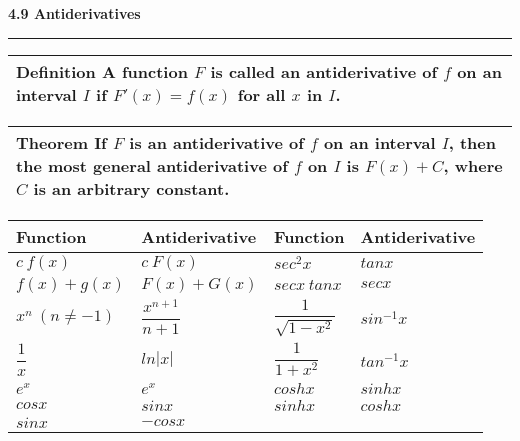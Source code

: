 \documentclass{article}
\begin{document}
\begin{center}
\Large\textbf{4.9 Antiderivatives}

\noindent\hfill\rule{0.3\textwidth}{.4pt}\hfill
\vspace{24pt}

\large
\def\arraystretch{1.3}
{\setlength{\tabcolsep}{16pt}
\begin{tabularx}{.9\textwidth}{|X|}
\hline
	\vspace{1pt}
	\textbf{Definition} \: A function $F$ is called an \textbf{antiderivative} of $f$ on an interval $I$ if $F'(x) = f(x)$ for all $x$ in $I$. \\[12pt]
\hline
\end{tabularx}}
\vspace{12pt}

\large
\def\arraystretch{1.3}
{\setlength{\tabcolsep}{16pt}
\begin{tabularx}{.9\textwidth}{|X|}
\hline
	\vspace{1pt}
	\textbf{Theorem} \: If $F$ is an antiderivative of $f$ on an interval $I$, then the most general antiderivative of $f$ on $I$ is $F(x) + C$, where $C$ is an arbitrary constant. \\[12pt]
\hline
\end{tabularx}}
\vspace{24pt}

\large
\def\arraystretch{2}
{\setlength{\tabcolsep}{16pt}
\begin{tabularx}{.9\textwidth}{| X | l || X | l |}
\hline
	
	\textbf{Function} & \textbf{Antiderivative} & \textbf{Function} & \textbf{Antiderivative}  \\
	\hline
	$c \: f(x)$ & $c \: F(x)$ & $sec^2 x$ & $tan x$  \\
	$f(x) + g(x)$ & $F(x) + G(x)$ & $secx \: tanx$ & $sec x$ \\[12pt]
	$x^n \: (n \ne -1)$ & $\dfrac{x^{n+1}}{n+1}$ & $\dfrac{1}{\sqrt{1-x^2}}$ & $sin^{-1} x$ \\[16pt]
	$\dfrac{1}{x}$ & $ln |x|$ & $\dfrac{1}{1+x^2}$ & $tan^{-1} x$ \\[7pt]
	$e^x$ & $e^x$ & $coshx$ & $sinhx$ \\
	$cosx$ & $sinx$ & $sinhx$ & $coshx$ \\
	$sinx$ & $-cosx$ & & \\
	
\hline
\end{tabularx}}
\end{center}
\end{document}
